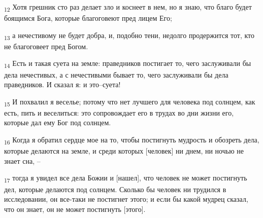 \begin{tcolorbox}
\textsubscript{12} Хотя грешник сто раз делает зло и коснеет в нем, но я знаю, что благо будет боящимся Бога, которые благоговеют пред лицем Его;
\end{tcolorbox}
\begin{tcolorbox}
\textsubscript{13} а нечестивому не будет добра, и, подобно тени, недолго продержится тот, кто не благоговеет пред Богом.
\end{tcolorbox}
\begin{tcolorbox}
\textsubscript{14} Есть и такая суета на земле: праведников постигает то, чего заслуживали бы дела нечестивых, а с нечестивыми бывает то, чего заслуживали бы дела праведников. И сказал я: и это--суета!
\end{tcolorbox}
\begin{tcolorbox}
\textsubscript{15} И похвалил я веселье; потому что нет лучшего для человека под солнцем, как есть, пить и веселиться: это сопровождает его в трудах во дни жизни его, которые дал ему Бог под солнцем.
\end{tcolorbox}
\begin{tcolorbox}
\textsubscript{16} Когда я обратил сердце мое на то, чтобы постигнуть мудрость и обозреть дела, которые делаются на земле, и среди которых [человек] ни днем, ни ночью не знает сна, --
\end{tcolorbox}
\begin{tcolorbox}
\textsubscript{17} тогда я увидел все дела Божии и [нашел], что человек не может постигнуть дел, которые делаются под солнцем. Сколько бы человек ни трудился в исследовании, он все-таки не постигнет этого; и если бы какой мудрец сказал, что он знает, он не может постигнуть [этого].
\end{tcolorbox}
